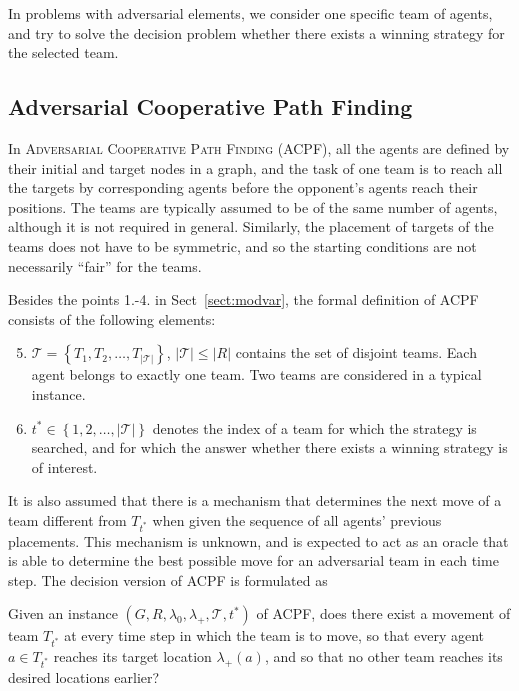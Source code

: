 In problems with adversarial elements, we consider one specific team of agents, and try to solve the decision problem whether there exists a winning strategy for the selected team. 

\subsection{Adversarial Cooperative Path Finding}

In \textsc{Adversarial Cooperative Path Finding} (ACPF), all the agents are defined by their initial and target nodes in a graph, 
and the task of one team is to reach all the targets by corresponding agents before the opponent's agents reach their positions.
The teams are typically assumed to be of the same number of agents, although it is not required in general.
Similarly, the placement of targets of the teams does not have to be symmetric, and so the starting conditions are not necessarily ``fair'' for the teams.

Besides the points 1.-4. in Sect~\ref{sect:modvar}, the formal definition of ACPF consists of the following elements:
\begin{enumerate}
		\setcounter{enumi}{4}
	\item $\mathcal{T}=\left\{T_1,T_2,\dots,T_{|\mathcal{T}|}\right\}$, $|\mathcal{T}|\leq|R|$ contains the set of disjoint teams.
		Each agent belongs to exactly one team. 
		Two teams are considered in a typical instance. 
	\item $t^*\in\left\{1,2,\dots,|\mathcal{T}|\right\}$ denotes the index of a team for which the strategy is searched, 
		and for which the answer whether there exists a winning strategy is of interest.
\end{enumerate}
It is also assumed that there is a mechanism that determines the next move of a team different from $T_{t^*}$ when given the sequence of all agents' previous placements. 
This mechanism is unknown, and is expected to act as an oracle that is able to determine the best possible move for an adversarial team in each time step.
The decision version of ACPF is formulated as
\begin{problem}
Given an instance $(G,R,\lambda_0,\lambda_+,\mathcal{T},t^*)$ of ACPF, does there exist a movement of team $T_{t^*}$ at every time step in which the team is to move, 
so that every agent $a\in T_{t^*}$ reaches its target location $\lambda_+(a)$, and so that no other team reaches its desired locations earlier?
\end{problem}

